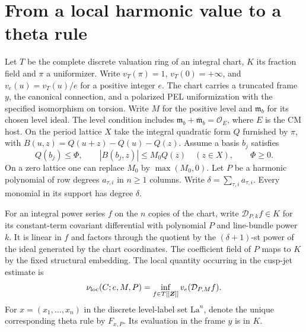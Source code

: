 \section{From a local harmonic value to a theta rule}
\label{sec:local-theta-jets}

Let \(T\) be the complete discrete valuation ring of an integral chart,
\(K\) its fraction field and \(\pi\) a uniformizer. Write
\(v_T(\pi)=1\), \(v_T(0)=+\infty\), and
\(v_e(u)=v_T(u)/e\) for a positive integer \(e\). The chart carries
a truncated frame \(y\), the canonical connection, and a polarized
PEL uniformization with the specified isomorphism on torsion.
Write \(M\) for the positive level and \(\mathfrak m_b\) for its
chosen level ideal. The level condition includes
\(\mathfrak m_b+\overline{\mathfrak m}_b=\mathcal O_E\), where \(E\)
is the CM host. On the period lattice \(X\) take the integral
quadratic form \(Q\) furnished by \(\pi\), with
\(B(u,z)=Q(u+z)-Q(u)-Q(z)\).
Assume a basis \(b_j\) satisfies
\[
  Q(b_j)\le\Phi,\qquad |B(b_j,z)|\le M_0 Q(z)
       \quad(z\in X),\qquad \Phi\ge0 .
\]
On a zero lattice one can replace \(M_0\) by \(\max(M_0,0)\).
Let \(P\) be a harmonic polynomial of row degrees \(a_{\tau,i}\)
in \(n\ge1\) columns. Write \(\delta=\sum_{\tau,i}a_{\tau,i}\).
Every monomial in its support has degree \(\delta\).

For an integral power series \(f\) on the \(n\) copies of the chart,
write \(\mathcal D_{P,k}f\in K\) for its constant-term covariant
differential with polynomial \(P\) and line-bundle power \(k\).
It is linear in \(f\) and factors through the quotient by the
\((\delta+1)\)-st power of the ideal generated by the chart
coordinates. The coefficient field of \(P\) maps to \(K\) by the
fixed structural embedding. The local quantity occurring in the
cusp-jet estimate is
\[
       \nu_{\rm loc}(C;e,M,P)=
          \inf_{f\in T[[\boldsymbol Z]]}v_e(\mathcal D_{P,M}f).
\]
For \(x=(x_1,\ldots,x_n)\) in the discrete level-label set
\(\mathrm{La}^n\), denote the unique corresponding theta rule
by \(F_{x,P}\). Its evaluation in the frame \(y\) is in \(K\).

